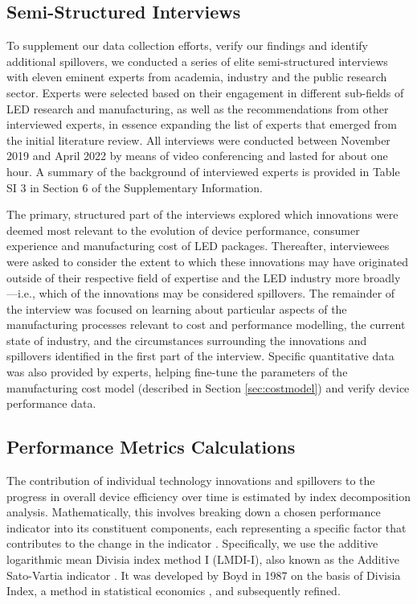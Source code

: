\documentclass[twoside,twocolumn,9pt]{article}
\begin{document}
\subsection{Semi-Structured Interviews}

To supplement our data collection efforts, verify our findings and identify additional spillovers, we conducted a series of elite semi-structured interviews with eleven eminent experts from academia, industry and the public research sector. Experts were selected based on their engagement in  different sub-fields of LED research and manufacturing, as well as the recommendations from other interviewed experts, in essence expanding the list of experts that emerged from the initial literature review. All interviews were conducted between November 2019 and April 2022 by means of video conferencing and lasted for about one hour. A summary of the background of interviewed experts is provided in Table SI 3 in Section 6 of the Supplementary Information.

The primary, structured part of the interviews explored which innovations were deemed most relevant to the evolution of device performance, consumer experience and manufacturing cost of LED packages. Thereafter, interviewees were asked to consider the extent to which these innovations may have originated outside of their respective field of expertise and the LED industry more broadly—i.e., which of the innovations may be considered spillovers. The remainder of the interview was focused on learning about particular aspects of the manufacturing processes relevant to cost and performance modelling, the current state of industry, and the circumstances surrounding the innovations and spillovers identified in the first part of the interview. Specific quantitative data was also provided by experts, helping fine-tune the parameters of the manufacturing cost model (described in Section \ref{sec:costmodel}) and verify device performance data.

\subsection{Performance Metrics Calculations}
\label{subsec:metrics}

The contribution of individual technology innovations and spillovers to the progress in overall device efficiency over time is estimated by index decomposition analysis. Mathematically, this involves breaking down a chosen performance indicator into its constituent components, each representing a specific factor that contributes to the change in the indicator \cite{Ang1997}. Specifically, we use the additive logarithmic mean Divisia index method I (LMDI-I), also known as the Additive Sato-Vartia indicator \cite{deBoer2019}. It was developed by Boyd in 1987 \cite{Boyd1987} on the basis of Divisia Index, a method in statistical economics \cite{Diewert1988}, and subsequently refined.
\end{document}

